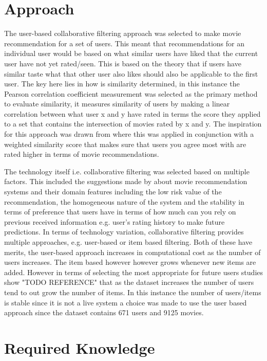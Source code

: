\section{Approach}
The user-based collaborative filtering approach was selected to make movie recommendation for a set of users. This meant that recommendations for an individual user would be based on what similar users have liked that the current user have not yet rated/seen. This is based on the theory that if users have similar taste what that other user also likes should also be applicable to the first user. The key here lies in how is similarity determined, in this instance the Pearson correlation coefficient measurement was selected as the primary method to evaluate similarity, it measures similarity of users by making a linear correlation between what user x and y have rated in terms the score they applied to a set that contains the intersection of movies rated by x and y. The inspiration for this approach was drawn from \cite{Lead} where this was applied in conjunction with a weighted similarity score that makes sure that users you agree most with are rated higher in terms of movie recommendations.

The technology itself i.e. collaborative filtering was selected based on multiple factors. This included the suggestions made by \cite{Burke2011} about movie recommendation systems and their domain features including the low risk value of the recommendation, the homogeneous nature of the system and the stability in terms of preference that users have in terms of how much can you rely on previous received information e.g. user's rating history to make future predictions. In terms of technology variation, collaborative filtering provides multiple approaches, e.g. user-based or item based filtering. Both of these have merits, the user-based approach increases in computational cost as the number of users increases. The item based however however grows whenever new items are added. However in terms of selecting the most appropriate for future users studies show "TODO REFERENCE" that as the dataset increases the number of users tend to out grow the number of items. In this instance the number of users/items is stable since it is not a live system a choice was made to use the user based approach since the dataset contains 671 users and 9125 movies.

\section{Required Knowledge}

